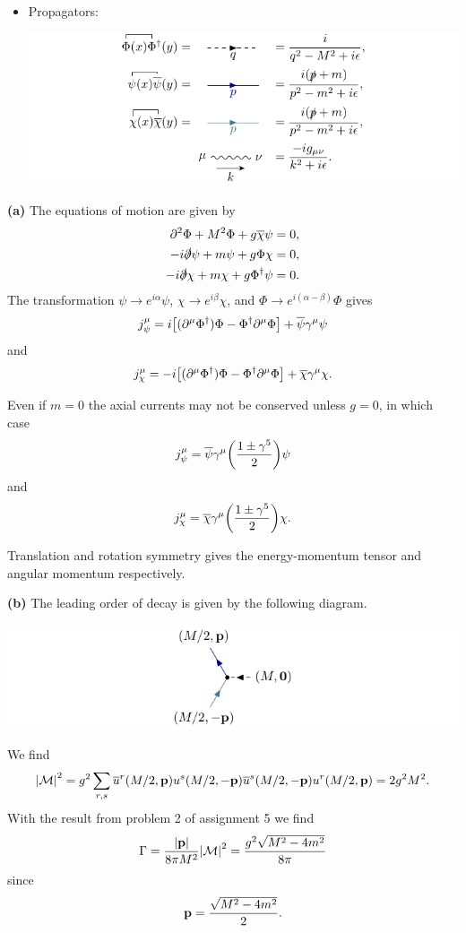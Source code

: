 \documentclass{article}
\makeatletter
\newcommand*{\shifttext}[1]{%
  \settowidth{\@tempdima}{#1}%
  \hspace{-\@tempdima}#1%
}
\newcommand{\plabel}[1]{%
\shifttext{\textbf{#1}\quad}%
}
\makeatother
\begin{document}
\begin{itemize}
\begin{center}
    \end{center}
    \item Propagators:
    \begin{center}
        \includegraphics{img/propagator/propagator.pdf}
    \end{center}
\end{itemize}

% 
% 

\plabel{(a)}%
The equations of motion are given by
\begin{align*}
    \partial^2 \Phi + M^2 \Phi + g\overline{\chi} \psi &= 0, \\
    -i\slashed{\partial} \psi + m\psi + g\Phi\chi &= 0, \\
    -i\slashed{\partial} \chi + m\chi + g\Phi^\dagger \psi &= 0.
\end{align*}
The transformation $\psi \rightarrow e^{i\alpha}\psi$, $\chi \rightarrow e^{i\beta}\chi$, and $\Phi \rightarrow e^{i(\alpha - \beta)} \Phi$ gives
\[ j^\mu_\psi = i\qty[(\partial^\mu \Phi^\dagger)\Phi - \Phi^\dagger \partial^\mu \Phi] + \overline{\psi} \gamma^\mu \psi \]
and
\[ j^\mu_\chi = -i\qty[(\partial^\mu \Phi^\dagger)\Phi - \Phi^\dagger \partial^\mu \Phi] + \overline{\chi} \gamma^\mu \chi. \]

Even if $m=0$ the axial currents may not be conserved unless $g=0$, in which case
\[ j^\mu_\psi = \overline{\psi} \gamma^\mu \qty(\frac{1\pm \gamma^5}{2}) \psi \]
and
\[ j^\mu_\chi = \overline{\chi} \gamma^\mu \qty(\frac{1\pm \gamma^5}{2}) \chi. \]

Translation and rotation symmetry gives the energy-momentum tensor and angular momentum respectively.

\plabel{(b)}%
The leading order of decay is given by the following diagram.
\begin{center}
    \includegraphics{img/decay/decay.pdf}
\end{center}
We find
\[ \abs{\mathcal{M}}^2 = g^2 \sum_{r,s} \overline{u}^r(M/2,\vb{p}) {u}^s(M/2,-\vb{p})\overline{u}^s(M/2,-\vb{p}) {u}^r(M/2,\vb{p}) = 2 g^2 M^2. \]
With the result from problem 2 of assignment 5 we find
\[ \Gamma = \frac{\abs{\vb{p}}}{8\pi M^2} \abs{\mathcal{M}}^2 = \frac{g^2 \sqrt{M^2 - 4m^2}}{8\pi} \]
since
\[ \vb{p} = \frac{\sqrt{M^2 - 4m^2}}{2}. \]
\end{document}
